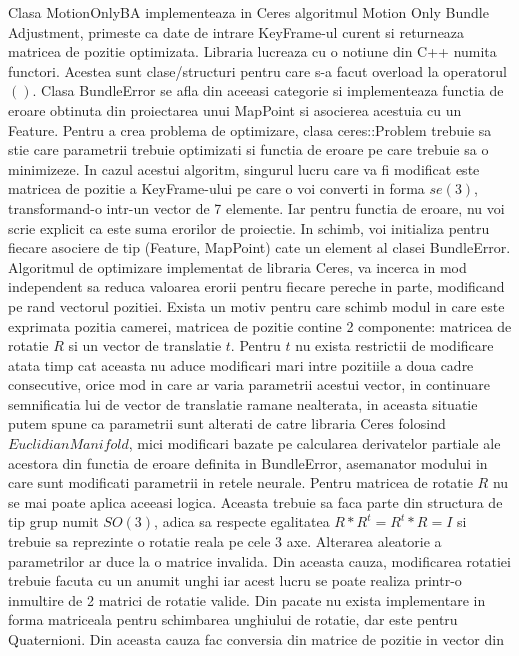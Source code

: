 \documentclass[12pt,a4paper]{report}
\begin{document}
Clasa MotionOnlyBA implementeaza in Ceres algoritmul Motion Only Bundle Adjustment,
primeste ca date de intrare KeyFrame-ul curent si returneaza matricea de pozitie optimizata.
Libraria lucreaza cu o notiune din C++ numita functori. Acestea sunt clase/structuri pentru
care s-a facut overload la operatorul $ () $. Clasa BundleError se afla din aceeasi categorie
si implementeaza functia de eroare obtinuta din proiectarea unui MapPoint si asocierea 
acestuia cu un Feature. Pentru a crea problema de optimizare, clasa ceres::Problem trebuie 
sa stie care parametrii trebuie optimizati si functia de eroare pe care trebuie sa o minimizeze.
In cazul acestui algoritm, singurul lucru care va fi modificat este matricea de pozitie a KeyFrame-ului
pe care o voi converti in forma $ se(3) $, transformand-o intr-un vector de 7 elemente. Iar pentru 
functia de eroare, nu voi scrie explicit ca este suma erorilor de proiectie. In schimb, voi initializa pentru
fiecare asociere de tip (Feature, MapPoint) cate un element al clasei BundleError. Algoritmul de 
optimizare implementat de libraria Ceres, va incerca in mod independent sa reduca valoarea erorii 
pentru fiecare pereche in parte, modificand pe rand vectorul pozitiei. Exista un motiv pentru 
care schimb modul in care este exprimata pozitia camerei, matricea de pozitie contine 2 componente:
matricea de rotatie $ R $ si un vector de translatie $ t $. Pentru $ t $ nu exista restrictii 
de modificare atata timp cat aceasta nu aduce modificari mari intre pozitiile a doua cadre consecutive,
orice mod in care ar varia parametrii acestui vector, in continuare semnificatia
lui de vector de translatie ramane nealterata, in aceasta situatie putem spune ca parametrii 
sunt alterati de catre libraria Ceres folosind $ EuclidianManifold $, mici modificari bazate pe
calcularea derivatelor partiale ale acestora din functia de eroare definita in BundleError, asemanator 
modului in care sunt modificati parametrii in retele neurale. Pentru matricea de rotatie $ R $ nu se 
mai poate aplica aceeasi logica. Aceasta trebuie sa faca parte din structura de tip grup numit 
$ SO(3) $, adica sa respecte egalitatea $ R * R^t = R^t * R = I $ si trebuie sa reprezinte o rotatie 
reala pe cele 3 axe. Alterarea aleatorie a parametrilor ar duce la o matrice invalida. Din aceasta
cauza, modificarea rotatiei trebuie facuta cu un anumit unghi
iar acest lucru se poate realiza printr-o inmultire de 2 matrici de rotatie valide. Din pacate nu 
exista implementare in forma matriceala pentru schimbarea unghiului de rotatie, dar este pentru
Quaternioni. Din aceasta cauza fac conversia din matrice de pozitie in vector din 
\end{document}
